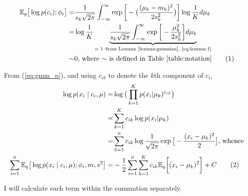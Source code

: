 \documentclass[]{article}
\newcommand{\Expectation} {\mathbb{E}}
\newcommand\numberthis    {\addtocounter{equation}{1}\tag{\theequation}}
\begin{document}
\begin{align*}
	\Expectation_q\big[\log{p(c_i);\phi_i}\big] =& \frac{1}{s_k\sqrt{2\pi}} \int_{-\infty}^{\infty} \exp{\bigg[-\big(\frac{(\mu_k-m_k)^2}{2 s_k^2}\big)\bigg]} \log{\frac{1}{K}} d \mu_k\\
	=& \log{\frac{1}{K}} \underbrace{\frac{1}{s_k\sqrt{2\pi}} \int_{-\infty}^{\infty} \exp{\bigg[-\frac{\mu_k^2}{2 s_k^2}\bigg]}  d \mu_k}_\text{$=1$--from Lemma \ref{lemma:gaussian}, \eqref{eq:lemma:1}}\\
	\sim & 0 \text{, where $\sim$ is defined in Table \ref{table:notation}}\numberthis \label{eq:ELBO:2}
\end{align*}

From  (\ref{eq:gmm_p}), and using $c_{ik}$ to denote the $k$th component of $c_i$,
\begin{align*}
	\log{p(x_i\mid c_i,\mu)} =& \log{\big(\prod_{k=1}^{K} p(x_i|\mu_k)^{c_{ik}}\big)}\\
	=&\sum_{k=1}^{K}c_{ik} \log{p(x_i|\mu_k)}\\
	=&\sum_{k=1}^{n}c_{ik} \log{\frac{1}{\sqrt{2\pi}} \exp{\big[-\frac{(x_i-\mu_k)^2}{2}\big]}} \text{, whence}\\
	\sum_{i=1}^{n}\Expectation_q\big[\log{p(x_i\mid c_i,\mu);\phi_i,m,s^2}\big] =& - \frac{1}{2}  \sum_{i=1}^{n} \sum_{k=1}^{K} c_{ik} \Expectation_q\bigg[ (x_i-\mu_k)^2\bigg] + C  \numberthis \label{eq:ELBO:3}
\end{align*}

I will calculate each term within the summation separately.  
\end{document}
